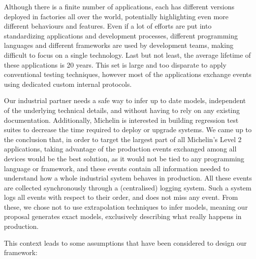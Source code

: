 
Although there is a finite number of applications, each has
different versions deployed in factories all over the world,
potentially highlighting even more different behaviours and
features. Even if a lot of efforts are put into standardizing
applications and development processes, different programming
languages and different frameworks are used by development
teams, making difficult to focus on a single technology. Last
but not least, the average lifetime of these applications is 20
years. This set is large and too disparate to apply conventional
testing techniques, however most of the applications exchange
events using dedicated custom internal protocols.

Our industrial partner needs a safe way to infer up to date
models, independent of the underlying technical details, and without
having to rely on any existing documentation. Additionally,
Michelin is interested in building regression test suites to
decrease the time required to deploy or upgrade systems. We
came up to the conclusion that, in order to target the largest
part of all Michelin's Level 2 applications, taking advantage of
the production events exchanged among all devices would be the
best solution, as it would not be tied to any programming
language or framework, and these events contain all information
needed to understand how a whole industrial system behaves in
production. All these events are collected synchronously through a
(centralised) logging system. Such a system logs all events with
respect to their order, and does not miss any event.  From these,
we chose not to use extrapolation techniques to infer models,
meaning our proposal generates exact models, exclusively
describing what really happens in production.

This context leads to some assumptions that have been considered
to design our framework:

